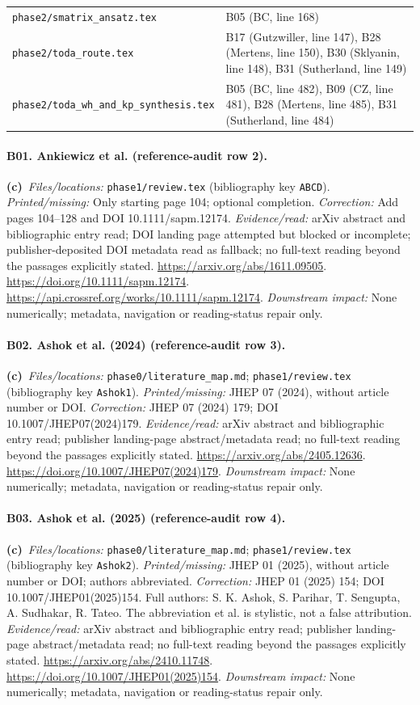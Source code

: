 \documentclass[11pt,a4paper]{article}
\newcommand{\C}{\textbf{(c)}\ }
\newcommand{\file}[1]{\nolinkurl{#1}}
\begin{document}
\begin{longtable}{@{}L{5.6cm}L{9.4cm}@{}}
\file{phase2/smatrix_ansatz.tex} & B05 (BC, line 168)\\
\file{phase2/toda_route.tex} & B17 (Gutzwiller, line 147), B28 (Mertens, line 150), B30 (Sklyanin, line 148), B31 (Sutherland, line 149)\\
\file{phase2/toda_wh_and_kp_synthesis.tex} & B05 (BC, line 482), B09 (CZ, line 481), B28 (Mertens, line 485), B31 (Sutherland, line 484)\\
\bottomrule\end{longtable}\normalsize
\paragraph{B01. Ankiewicz et al. (reference-audit row 2).}
\C \textit{Files/locations:} \file{phase1/review.tex} (bibliography key \file{ABCD}).
\textit{Printed/missing:} Only starting page 104; optional completion.
\textit{Correction:} Add pages 104--128 and DOI 10.1111/sapm.12174.
\textit{Evidence/read:} arXiv abstract and bibliographic entry read; DOI landing page attempted but blocked or incomplete; publisher-deposited DOI metadata read as fallback; no full-text reading beyond the passages explicitly stated.
\url{https://arxiv.org/abs/1611.09505}.
\url{https://doi.org/10.1111/sapm.12174}.
\url{https://api.crossref.org/works/10.1111/sapm.12174}.
\textit{Downstream impact:} None numerically; metadata, navigation or reading-status repair only.
\paragraph{B02. Ashok et al. (2024) (reference-audit row 3).}
\C \textit{Files/locations:} \file{phase0/literature_map.md}; \file{phase1/review.tex} (bibliography key \file{Ashok1}).
\textit{Printed/missing:} JHEP 07 (2024), without article number or DOI.
\textit{Correction:} JHEP 07 (2024) 179; DOI 10.1007/JHEP07(2024)179.
\textit{Evidence/read:} arXiv abstract and bibliographic entry read; publisher landing-page abstract/metadata read; no full-text reading beyond the passages explicitly stated.
\url{https://arxiv.org/abs/2405.12636}.
\url{https://doi.org/10.1007/JHEP07(2024)179}.
\textit{Downstream impact:} None numerically; metadata, navigation or reading-status repair only.
\paragraph{B03. Ashok et al. (2025) (reference-audit row 4).}
\C \textit{Files/locations:} \file{phase0/literature_map.md}; \file{phase1/review.tex} (bibliography key \file{Ashok2}).
\textit{Printed/missing:} JHEP 01 (2025), without article number or DOI; authors abbreviated.
\textit{Correction:} JHEP 01 (2025) 154; DOI 10.1007/JHEP01(2025)154. Full authors: S. K. Ashok, S. Parihar, T. Sengupta, A. Sudhakar, R. Tateo. The abbreviation et al. is stylistic, not a false attribution.
\textit{Evidence/read:} arXiv abstract and bibliographic entry read; publisher landing-page abstract/metadata read; no full-text reading beyond the passages explicitly stated.
\url{https://arxiv.org/abs/2410.11748}.
\url{https://doi.org/10.1007/JHEP01(2025)154}.
\textit{Downstream impact:} None numerically; metadata, navigation or reading-status repair only.
\end{document}
